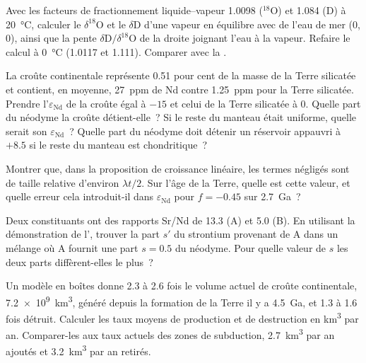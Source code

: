 \begin{exercise}[$\star\star$]\label{exo:b2:isotope-geochemistry:8}
Avec les facteurs de fractionnement liquide--vapeur 1.0098 ($^{18}$O) et 1.084 (D) à
\qty{20}{\degreeCelsius}, calculer le $\delta^{18}\mathrm{O}$ et le $\delta\mathrm{D}$ d'une
vapeur en équilibre avec de l'eau de mer (0, 0), ainsi que la pente
$\delta\mathrm{D}/\delta^{18}\mathrm{O}$ de la droite joignant l'eau à la vapeur. Refaire le calcul
à \qty{0}{\degreeCelsius} (1.0117 et 1.111). Comparer avec la .
\end{exercise}

\begin{exercise}[$\star\star$]\label{exo:b2:isotope-geochemistry:9}
La croûte continentale représente 0.51 pour cent de la masse de la Terre silicatée et contient,
en moyenne, \qty{27}{ppm} de Nd contre \qty{1.25}{ppm} pour la Terre silicatée. Prendre
l'$\varepsilon_{\mathrm{Nd}}$ de la croûte égal à $-15$ et celui de la Terre silicatée à 0. Quelle
part du néodyme la croûte détient-elle~? Si le reste du manteau était uniforme,
quelle serait son $\varepsilon_{\mathrm{Nd}}$~? Quelle part du néodyme doit détenir un
réservoir appauvri à $+8.5$ si le reste du manteau est chondritique~?
\end{exercise}

\begin{exercise}[$\star\star\star$]\label{exo:b2:isotope-geochemistry:10}
Montrer que, dans la proposition de croissance linéaire, les termes négligés sont de taille relative
d'environ $\lambda t/2$. Sur l'âge de la Terre, quelle est cette valeur, et quelle
erreur cela introduit-il dans $\varepsilon_{\mathrm{Nd}}$ pour $f = -0.45$ sur
\qty{2.7}{Ga}~?
\end{exercise}

\begin{exercise}[$\star\star\star$]\label{exo:b2:isotope-geochemistry:11}
Deux constituants ont des rapports Sr/Nd de 13.3 (A) et 5.0 (B). En utilisant la démonstration de
l', trouver la part $s'$ du strontium provenant de A dans un mélange où A
fournit une part $s = 0.5$ du néodyme. Pour quelle valeur de $s$ les deux
parts diffèrent-elles le plus~?
\end{exercise}

\begin{exercise}[$\star\star\star$]\label{exo:b2:isotope-geochemistry:12}
Un modèle en boîtes donne 2.3 à 2.6 fois le volume actuel de croûte continentale,
\qty{7.2e9}{km^3}, généré depuis la formation de la Terre il y a \qty{4.5}{Ga}, et 1.3 à 1.6
fois détruit. Calculer les taux moyens de production et de destruction en
\unit{km^3} par an. Comparer-les aux taux actuels des zones de subduction,
\qty{2.7}{km^3} par an ajoutés et \qty{3.2}{km^3} par an retirés.
\end{exercise}

